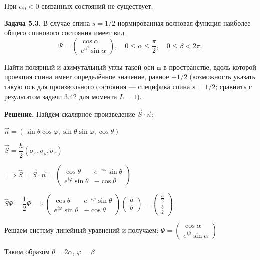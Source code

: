\documentclass[a4paper, 12pt]{article}
\begin{document}
	При \( \alpha_0 < 0 \) связанных состояний не существует.
	
	\quad \textbf{Задача 5.3. } В случае спина \( s = 1/2 \) нормированная волновая функция наиболее общего спинового состояния имеет вид
	\[
	\Psi = \begin{pmatrix} \cos \alpha \\ e^{i\beta} \sin \alpha \end{pmatrix},
	\quad
	0 \leq \alpha \leq \frac{\pi}{2}, \quad 0 \leq \beta < 2\pi.
	\]
	
	Найти полярный и азимутальный углы такой оси \( \mathbf{n} \) в пространстве, вдоль которой проекция спина имеет определённое значение, равное \( +1/2 \) (возможность указать такую ось для произвольного состояния — специфика спина \( s = 1/2 \); сравнить с результатом задачи 3.42 для момента \( L = 1 \)).
	
	\quad \textbf{Решение. } Найдём скалярное произведение $\vec{S} \cdot \vec{n} $:
	
	\begin{center}
		$\vec{n} = (\sin\theta \cos\varphi, \sin\theta\sin\varphi, \cos\theta)$
		
		$\vec{S} = \dfrac{\hbar}{2} \left(\sigma_x, \sigma_y, \sigma_z \right)$
		
		$\implies \hat{S} = \vec{S}\cdot\vec{n} = \left(\begin{array}{cc}
			\cos\theta & e^{-i\varphi}\sin\theta \\
			e^{i\varphi}\sin\theta & - \cos\theta 
		\end{array}\right)$
		
		$\hat{S} \Psi = \dfrac{1}{2} \Psi \implies \left(\begin{array}{cc}
			\cos\theta & e^{-i\varphi}\sin\theta \\
			e^{i\varphi}\sin\theta & - \cos\theta 
		\end{array}\right) \left(\begin{array}{c}
			a \\
			b
		\end{array}\right) = \left(\begin{array}{c}
			\frac{a}{2} \\
			\frac{b}{2}
		\end{array}\right)$
	\end{center}
	
	\quad Решаем систему линейный уравнений и получаем: $\Psi = \left(\begin{array}{c}
		\cos\alpha \\
		e^{i\beta}\sin\alpha
	\end{array}\right)$
	
	\quad Таким образом $\theta = 2\alpha$, $\varphi = \beta$
\end{document}
